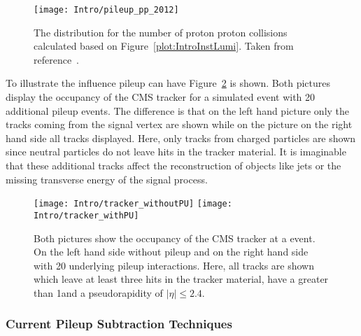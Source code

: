\begin{figure}[!Hhtb]
    \centering
    \texttt{[image: Intro/pileup\_pp\_2012]}
    \caption[Number of proton proton collisions]{The distribution for the number of proton proton collisions calculated based on Figure~\ref{plot:IntroInstLumi}. Taken from reference~. \label{plot:IntroPileupDistr}}
\end{figure}

To illustrate the influence pileup can have Figure~\ref{plot:IntroOccuTracker} is shown. Both pictures display the occupancy of the CMS tracker for a simulated \ttbar event with 20 additional pileup events. The difference is that on the left hand picture only the tracks coming from the signal vertex are shown while on the picture on the right hand side all tracks displayed. Here, only tracks from charged particles are shown since neutral particles do not leave hits in the tracker material. It is imaginable that these additional tracks affect the reconstruction of objects like jets or the missing transverse energy of the signal process.

\begin{figure}[!Hhtb]
    \centering
    \texttt{[image: Intro/tracker\_withoutPU]}
    \texttt{[image: Intro/tracker\_withPU]}
    \caption[Occupancy of the tracker with and without pileup]{Both pictures show the occupancy of the CMS tracker at a \ttbar event. On the left hand side without pileup and on the right hand side with 20 underlying pileup interactions. Here, all tracks are shown which leave at least three hits in the tracker material, have a \pt greater than 1\GeVc and a pseudorapidity of $\left|\eta\right|\leq2.4$. \label{plot:IntroOccuTracker}}
\end{figure}

\subsubsection{Current Pileup Subtraction Techniques \label{sec:IntroCurPST}}

